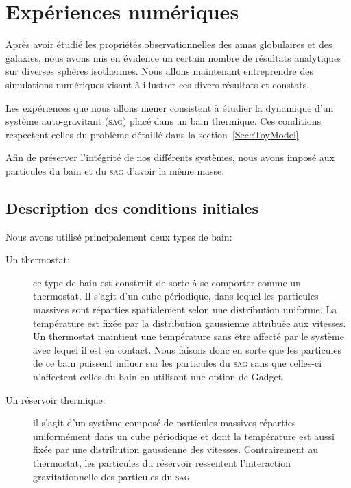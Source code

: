 \chapter{Expériences numériques}
	\minitoc

Après avoir étudié les propriétés observationnelles des amas globulaires et des galaxies, nous avons mis en évidence un certain nombre
de résultats analytiques sur diverses sphères isothermes. Nous allons maintenant entreprendre des simulations numériques visant
à illustrer ces divers résultats et constats.

Les expériences que nous allons mener consistent à étudier la dynamique d'un système auto-gravitant (\textsc{sag}) placé
dans un bain thermique. Ces conditions respectent celles du problème détaillé dans la section~\ref{Sec::ToyModel}.

Afin de préserver l'intégrité de nos différents systèmes, nous avons imposé aux particules du bain et du \textsc{sag} d'avoir la
même masse.

\section{Description des conditions initiales}

	Nous avons utilisé principalement deux types de bain:
	\begin{description}

		\item[Un thermostat:] ce type de bain est construit de sorte à se comporter comme un
			thermostat. Il s'agit d'un cube périodique, dans lequel les particules massives sont
			réparties spatialement selon une distribution uniforme. La température est fixée par la
			distribution gaussienne attribuée aux vitesses. Un thermostat maintient une
			température sans être affecté par le système avec lequel il est en contact.
			Nous faisons donc en sorte que les particules de ce bain puissent influer sur les
			particules du \textsc{sag} sans que celles-ci n'affectent celles du bain en utilisant
			une option de Gadget.

		\item[Un réservoir thermique:] il s'agit d'un système composé de particules massives réparties
			uniformément dans un cube périodique et dont la température est aussi fixée par une
			distribution gaussienne des vitesses. Contrairement au thermostat, les particules du
			réservoir ressentent l'interaction gravitationnelle des particules du \textsc{sag}.

	\end{description}

